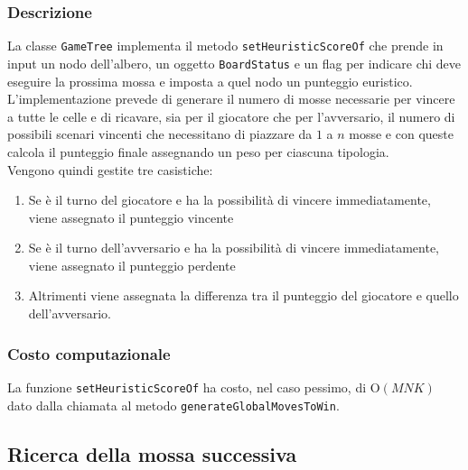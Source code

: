 \documentclass[11pt]{article}
\begin{document}
\subsubsection*{Descrizione}
La classe \texttt{GameTree} implementa il metodo \texttt{setHeuristicScoreOf} che prende in input un nodo dell'albero, un oggetto \texttt{BoardStatus} e un flag per indicare chi deve eseguire la prossima mossa e imposta a quel nodo un punteggio euristico.\\
L'implementazione prevede di generare il numero di mosse necessarie per vincere a tutte le celle e di ricavare, sia per il giocatore che per l'avversario, il numero di possibili scenari vincenti che necessitano di piazzare da $1$ a $n$ mosse e con queste calcola il punteggio finale assegnando un peso per ciascuna tipologia.\\
Vengono quindi gestite tre casistiche: 
\begin{enumerate}
\setlength\itemsep{0.05cm}
	\item Se è il turno del giocatore e ha la possibilità di vincere immediatamente, viene assegnato il punteggio vincente
	\item Se è il turno dell'avversario e ha la possibilità di vincere immediatamente, viene assegnato il punteggio perdente
	\item Altrimenti viene assegnata la differenza tra il punteggio del giocatore e quello dell'avversario.
\end{enumerate}
\subsubsection*{Costo computazionale}
La funzione \texttt{setHeuristicScoreOf} ha costo, nel caso pessimo, di O$(MNK)$ dato dalla chiamata al metodo \texttt{generateGlobalMovesToWin}.

\subsection*{Ricerca della mossa successiva}
\end{document}
